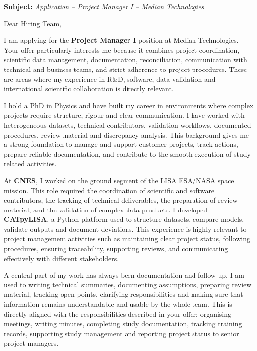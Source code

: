 \documentclass[11pt,a4paper]{altacv}
\begin{document}
\makecvheader
\vspace{-0.65cm}

\vspace{-0.45cm}

{\color{accent}\textbf{Subject:}} \textit{Application -- Project Manager I -- Median Technologies}

{\color{body}

Dear Hiring Team,

I am applying for the \textbf{Project Manager I} position at Median Technologies. Your offer particularly interests me because it combines project coordination, scientific data management, documentation, reconciliation, communication with technical and business teams, and strict adherence to project procedures. These are areas where my experience in R\&D, software, data validation and international scientific collaboration is directly relevant.

I hold a PhD in Physics and have built my career in environments where complex projects require structure, rigour and clear communication. I have worked with heterogeneous datasets, technical contributors, validation workflows, documented procedures, review material and discrepancy analysis. This background gives me a strong foundation to manage and support customer projects, track actions, prepare reliable documentation, and contribute to the smooth execution of study-related activities.

At \textbf{CNES}, I worked on the ground segment of the LISA ESA/NASA space mission. This role required the coordination of scientific and software contributors, the tracking of technical deliverables, the preparation of review material, and the validation of complex data products. I developed \textbf{CATpyLISA}, a Python platform used to structure datasets, compare models, validate outputs and document deviations. This experience is highly relevant to project management activities such as maintaining clear project status, following procedures, ensuring traceability, supporting reviews, and communicating effectively with different stakeholders.

A central part of my work has always been documentation and follow-up. I am used to writing technical summaries, documenting assumptions, preparing review material, tracking open points, clarifying responsibilities and making sure that information remains understandable and usable by the whole team. This is directly aligned with the responsibilities described in your offer: organising meetings, writing minutes, completing study documentation, tracking training records, supporting study management and reporting project status to senior project managers.

}
\end{document}
